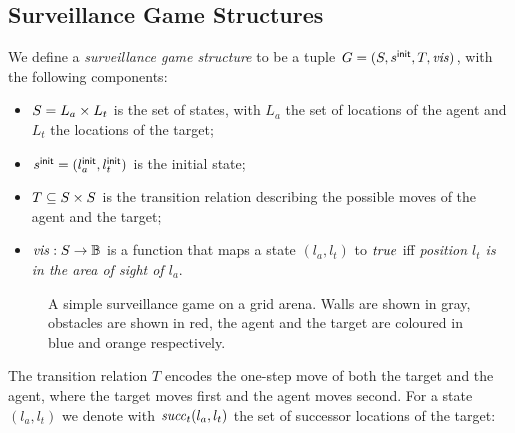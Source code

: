 \subsection{Surveillance Game Structures}\label{sec:surveillance-games}
We define a \emph{surveillance game structure} to be  a tuple $G  = (S,s^{\mathsf{init}},T,\mathit{vis})$, with the following components:
\begin{itemize}
\item $S = L_a \times L_t$ is the set of states, with $L_a$ the set of locations of the agent and $L_t$ the locations of the target;
\item $s^{\mathsf{init}} = (l_a^{\mathsf{init}},l_t^{\mathsf{init}})$ is the initial state;
\item $T \subseteq S \times S$ is the transition relation describing the possible moves of the agent and the target;
\item $\mathit{vis} : S \to \mathbb{B}$ is a function that maps a state $(l_a,l_t)$ to $\mathit{true}$ iff \emph{ position $l_t$ is in the area of sight of $l_a$}.
\end{itemize}

\begin{figure}
\hfill
{}

\caption{A simple surveillance game on a grid arena. Walls are shown in gray, obstacles are shown in red, the agent and the target are coloured in blue and orange respectively.}
\label{fig:simple-surveillance-game}
\end{figure}

The transition relation $T$ encodes the one-step move of both the target and the agent, where the target moves first and the agent moves second. For a state $(l_a,l_t)$ we denote with $\mathit{succ}_t(l_a,l_t)$ the set of successor locations of the target:

